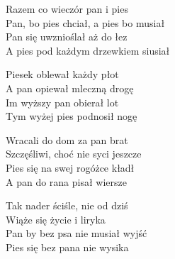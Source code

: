 \begin{text}
    Razem co wieczór pan i pies\\
    Pan, bo pies chciał, a pies bo musiał\\
    Pan się uwznioślał aż do łez\\
    A pies pod każdym drzewkiem siusiał

    Piesek oblewał każdy płot\\
    A pan opiewał mleczną drogę\\
    Im wyższy pan obierał lot\\
    Tym wyżej pies podnosił nogę

    Wracali do dom za pan brat\\
    Szczęśliwi, choć nie syci jeszcze\\
    Pies się na swej rogóżce kładł\\
    A pan do rana pisał wiersze

    Tak nader ściśle, nie od dziś\\
    Wiąże się życie i liryka\\
    Pan by bez psa nie musiał wyjść\\
    Pies się bez pana nie wysika
\end{text}
\begin{chord}

\end{chord}